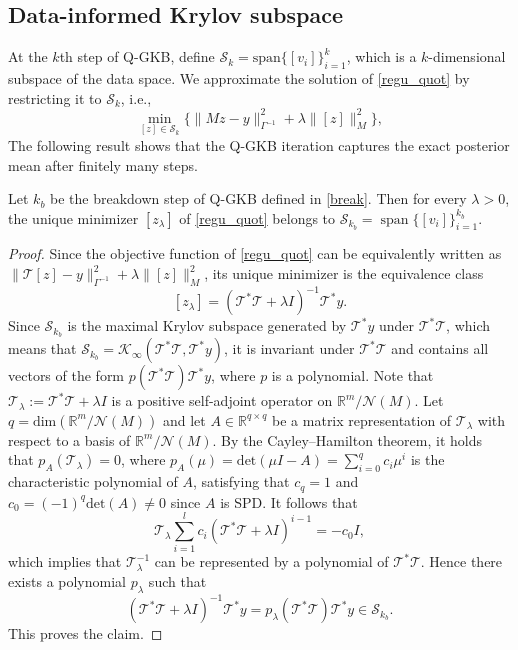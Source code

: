 \documentclass[]{myarticle}
\begin{document}
\subsection{Data-informed Krylov subspace}
At the $k$th step of Q-GKB, define $\mathcal{S}_k=\mathrm{span}\{[v_i]\}_{i=1}^{k}$, which is a $k$-dimensional subspace of the data space. We approximate the solution of \cref{regu_quot} by restricting it to $\mathcal{S}_k$, i.e.,
\begin{equation}\label{proj_regu}
  \min_{[z]\in\mathcal{S}_k}\{\|Mz-y\|_{\Gamma^{-1}}^2 + \lambda\|[z]\|_{M}^2 \},
\end{equation}
The following result shows that the Q-GKB iteration captures the exact posterior mean after finitely many steps.

\begin{theorem}\label{thm:tikhonov-krylov}
Let \(k_b\) be the breakdown step of Q-GKB defined in \cref{break}. Then for every \(\lambda>0\), the unique minimizer \([z_\lambda]\) of \cref{regu_quot} belongs to \(\mathcal S_{k_b}=\operatorname{span}\{[v_i]\}_{i=1}^{k_b}\).
\end{theorem}
\begin{proof}
  Since the objective function of \cref{regu_quot} can be equivalently written as $\|\mathcal{T}[z]-y\|_{\Gamma^{-1}}^2 + \lambda\|[z]\|_{M}^2$, its unique minimizer is the equivalence class
  \[[z_\lambda]=(\mathcal T^\ast\mathcal T+\lambda I)^{-1}\mathcal T^\ast y .\]
  Since \(\mathcal S_{k_b}\) is the maximal Krylov subspace generated by \(\mathcal T^\ast y\) under \(\mathcal T^\ast\mathcal T\), which means that $\mathcal S_{k_b}=\mathcal{K}_{\infty}(\mathcal T^\ast\mathcal T, \mathcal T^\ast y)$, it is invariant under \(\mathcal T^\ast\mathcal T\) and contains all vectors of the form \(p(\mathcal T^\ast\mathcal T)\mathcal T^\ast y\), where \(p\) is a polynomial. Note that $\mathcal T_{\lambda}:=\mathcal T^\ast\mathcal T+\lambda I$ is a positive self-adjoint operator on $\mathbb{R}^{m}/\mathcal{N}(M)$. Let $q=\mathrm{dim}(\mathbb{R}^{m}/\mathcal{N}(M))$ and let $A\in\mathbb{R}^{q\times q}$ be a matrix representation of $\mathcal T_{\lambda}$ with respect to a basis of $\mathbb{R}^{m}/\mathcal{N}(M)$. By the Cayley--Hamilton theorem, it holds that $p_{A}(\mathcal T_{\lambda})=0$, where $p_{A}(\mu) = \mathrm{det}(\mu I-A)=\sum_{i=0}^{q}c_i \mu^i$ is the characteristic polynomial of $A$, satisfying that $c_q=1$ and $c_0=(-1)^{q}\mathrm{det}(A)\neq 0$ since $A$ is SPD. It follows that 
  \[\mathcal{T}_{\lambda}\sum_{i=1}^{l}c_{i}(\mathcal T^\ast\mathcal T + \lambda I)^{i-1}=-c_0 I,\] 
  which implies that $\mathcal{T}_{\lambda}^{-1}$ can be represented by a polynomial of \(\mathcal T^\ast\mathcal T\). Hence there exists a polynomial \(p_\lambda\) such that
  \[(\mathcal T^\ast\mathcal T+\lambda I)^{-1}\mathcal T^\ast y = 
  p_\lambda(\mathcal T^\ast\mathcal T)\mathcal T^\ast y\in \mathcal S_{k_b}.\]
  This proves the claim.
\end{proof}
\end{document}
